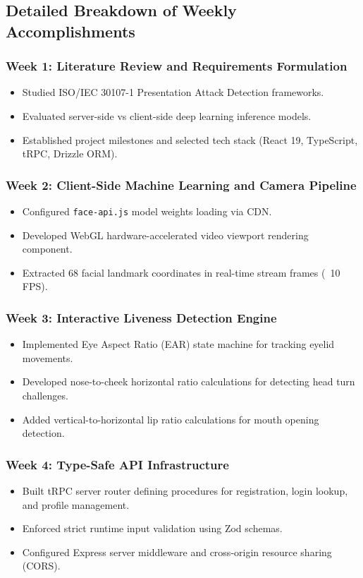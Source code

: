 \documentclass[12pt,a4paper,oneside]{article}
\begin{document}
\subsection{Detailed Breakdown of Weekly Accomplishments}

\subsubsection{Week 1: Literature Review and Requirements Formulation}
\begin{itemize}
    \item Studied ISO/IEC 30107-1 Presentation Attack Detection frameworks.
    \item Evaluated server-side vs client-side deep learning inference models.
    \item Established project milestones and selected tech stack (React 19, TypeScript, tRPC, Drizzle ORM).
\end{itemize}

\subsubsection{Week 2: Client-Side Machine Learning and Camera Pipeline}
\begin{itemize}
    \item Configured \texttt{face-api.js} model weights loading via CDN.
    \item Developed WebGL hardware-accelerated video viewport rendering component.
    \item Extracted 68 facial landmark coordinates in real-time stream frames (~10 FPS).
\end{itemize}

\subsubsection{Week 3: Interactive Liveness Detection Engine}
\begin{itemize}
    \item Implemented Eye Aspect Ratio (EAR) state machine for tracking eyelid movements.
    \item Developed nose-to-cheek horizontal ratio calculations for detecting head turn challenges.
    \item Added vertical-to-horizontal lip ratio calculations for mouth opening detection.
\end{itemize}

\subsubsection{Week 4: Type-Safe API Infrastructure}
\begin{itemize}
    \item Built tRPC server router defining procedures for registration, login lookup, and profile management.
    \item Enforced strict runtime input validation using Zod schemas.
    \item Configured Express server middleware and cross-origin resource sharing (CORS).
\end{itemize}
\end{document}
